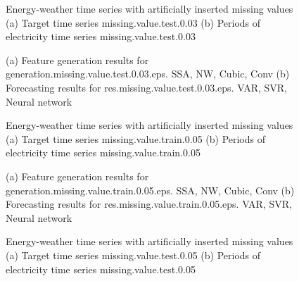 \documentclass[12pt]{article}
\begin{document}
\begin{figure}
\centering
{}
\caption{Energy-weather time series with artificially inserted missing values	(a) Target time series	missing.value.test.0.03	(b) Periods of electricity time series	missing.value.test.0.03	}
\end{figure}


\begin{figure}
\centering
{}
\caption{(a)	Feature generation results for	generation.missing.value.test.0.03.eps.	SSA, NW, Cubic, Conv	(b)	Forecasting results for	res.missing.value.test.0.03.eps.	VAR, SVR, Neural network	}
\end{figure}


\begin{figure}
\centering
{}
\caption{Energy-weather time series with artificially inserted missing values	(a) Target time series	missing.value.train.0.05	(b) Periods of electricity time series	missing.value.train.0.05	}
\end{figure}


\begin{figure}
\centering
{}
\caption{(a)	Feature generation results for	generation.missing.value.train.0.05.eps.	SSA, NW, Cubic, Conv	(b)	Forecasting results for	res.missing.value.train.0.05.eps.	VAR, SVR, Neural network	}
\end{figure}


\begin{figure}
\centering
{}
\caption{Energy-weather time series with artificially inserted missing values	(a) Target time series	missing.value.test.0.05	(b) Periods of electricity time series	missing.value.test.0.05	}
\end{figure}
\end{document}
